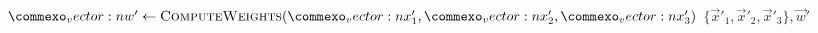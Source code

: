 {\begin{minipage}{\linewidth}
\begin{algorithm}[H]
\begin{algorithmic}[1]
        \State $\vec{w}' \leftarrow \textproc{ComputeWeights}(\vec{x}'_1, \vec{x}'_2, \vec{x}'_3)$
        \State \Return $\{\vec{x}'_1, \vec{x}'_2, \vec{x}'_3\}, \vec{w}'$
        \EndFunction
        \end{algorithmic}
    \end{algorithm}
\end{minipage}
\par}